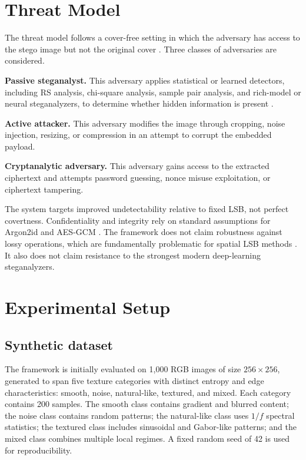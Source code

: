 \section{Threat Model}
The threat model follows a cover-free setting in which the adversary has access to the stego image but not the original cover \cite{fridrich2009book,ker2013}. Three classes of adversaries are considered.

\textbf{Passive steganalyst.} This adversary applies statistical or learned detectors, including RS analysis, chi-square analysis, sample pair analysis, and rich-model or neural steganalyzers, to determine whether hidden information is present \cite{westfeld1999,fridrich2001,dumitrescu2003,fridrich2012rich,kodovsky2012ensemble,yedroudj2018,boroumand2019}.

\textbf{Active attacker.} This adversary modifies the image through cropping, noise injection, resizing, or compression in an attempt to corrupt the embedded payload.

\textbf{Cryptanalytic adversary.} This adversary gains access to the extracted ciphertext and attempts password guessing, nonce misuse exploitation, or ciphertext tampering.

The system targets improved undetectability relative to fixed LSB, not perfect covertness. Confidentiality and integrity rely on standard assumptions for Argon2id and AES-GCM \cite{rfc9106,nistgcm}. The framework does not claim robustness against lossy operations, which are fundamentally problematic for spatial LSB methods \cite{cheddad2010,hussain2018}. It also does not claim resistance to the strongest modern deep-learning steganalyzers.

\section{Experimental Setup}
\subsection{Synthetic dataset}
The framework is initially evaluated on 1,000 RGB images of size \(256 \times 256\), generated to span five texture categories with distinct entropy and edge characteristics: smooth, noise, natural-like, textured, and mixed. Each category contains 200 samples. The smooth class contains gradient and blurred content; the noise class contains random patterns; the natural-like class uses \(1/f\) spectral statistics; the textured class includes sinusoidal and Gabor-like patterns; and the mixed class combines multiple local regimes. A fixed random seed of 42 is used for reproducibility.

